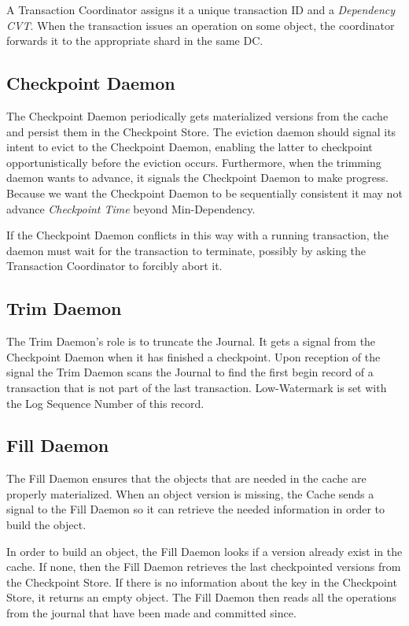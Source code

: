 \documentclass[twoside]{article}
\begin{document}
A Transaction Coordinator assigns it a unique transaction ID and
a \emph{Dependency CVT}.
When the transaction issues an operation on some object, the coordinator
forwards it to the appropriate shard in the same DC.

\subsection{Checkpoint Daemon}
\label{sec:checkpoint-daemon}

The Checkpoint Daemon periodically gets materialized versions from the cache and 
persist them in the Checkpoint Store.
The eviction daemon should signal its intent to evict to the
Checkpoint Daemon, enabling the latter to checkpoint 
opportunistically before the eviction occurs.
Furthermore, when the trimming daemon wants to advance, it signals the
Checkpoint Daemon to make progress.
Because we want the Checkpoint Daemon to be sequentially consistent
it may not advance \emph{Checkpoint Time} beyond Min-Dependency.

If the Checkpoint Daemon conflicts in this way with a running
transaction, the daemon must wait for the transaction to terminate,
possibly by asking the Transaction Coordinator to forcibly abort it.


\subsection{Trim Daemon}
\label{sec:trim-daemon}

The Trim Daemon's role is to truncate the Journal. 
It gets a signal from the Checkpoint Daemon when it has finished a checkpoint.
Upon reception of the signal the Trim Daemon scans the Journal to find 
the first begin record of a transaction that is not part of the last transaction.
Low-Watermark is set with the Log Sequence Number of this record.

\subsection{Fill Daemon}
\label{sec:fill-daemon}

The Fill Daemon ensures that the objects that are needed in the cache are properly
materialized. 
When an object version is missing, the Cache sends a signal to the Fill Daemon so it 
can retrieve the needed information in order to build the object.

In order to build an object, the Fill Daemon looks if a version
already exist in the cache. 
If none, then the Fill Daemon retrieves the last checkpointed versions 
from the Checkpoint Store.
If there is no information about the key in the Checkpoint Store, it returns
an empty object.
The Fill Daemon then reads all the operations from the journal that have been made and committed
since.
\end{document}
